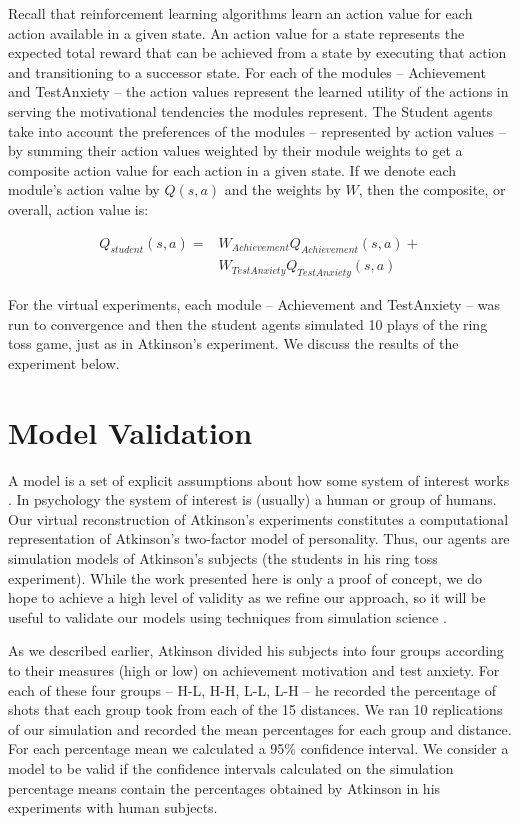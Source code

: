 Recall that reinforcement learning algorithms learn an action value for each action available in a given state.  An action value for a state represents the expected total reward that can be achieved from a state by executing that action and transitioning to a successor state. For each of the modules -- Achievement and TestAnxiety -- the action values represent the learned utility of the actions in serving the motivational tendencies the modules represent.  The Student agents take into account the preferences of the modules -- represented by action values -- by summing their action values weighted by their module weights to get a composite action value for each action in a given state.  If we denote each module's action value by $Q(s, a)$ and the weights by $W$, then the composite, or overall, action value is:

\begin{align}
Q_{student}(s,a) =  & W_{Achievement} Q_{Achievement}(s,a) +\\
                   & W_{TestAnxiety} Q_{TestAnxiety}(s,a)
\end{align}

For the virtual experiments, each module -- Achievement and TestAnxiety -- was run to convergence and then the student agents simulated 10 plays of the ring toss game, just as in Atkinson's experiment.  We discuss the results of the experiment below.

\section{Model Validation}

A model is a set of explicit assumptions about how some system of interest works \cite{law2007simulation}.  In psychology the system of interest is (usually) a human or group of humans.  Our virtual reconstruction of Atkinson's experiments constitutes a computational representation of Atkinson's two-factor model of personality.  Thus, our agents are simulation models of Atkinson's subjects (the students in his ring toss experiment).  While the work presented here is only a proof of concept, we do hope to achieve a high level of validity as we refine our approach, so it will be useful to validate our models using techniques from simulation science \cite{law2007simulation}.

As we described earlier, Atkinson divided his subjects into four groups according to their measures (high or low) on achievement motivation and test anxiety.  For each of these four groups -- H-L, H-H, L-L, L-H -- he recorded the percentage of shots that each group took from each of the 15 distances.  We ran 10 replications of our simulation and recorded the mean percentages for each group and distance.  For each percentage mean we calculated a 95\% confidence interval.  We consider a model to be valid if the confidence intervals calculated on the simulation percentage means contain the percentages obtained by Atkinson in his experiments with human subjects.

